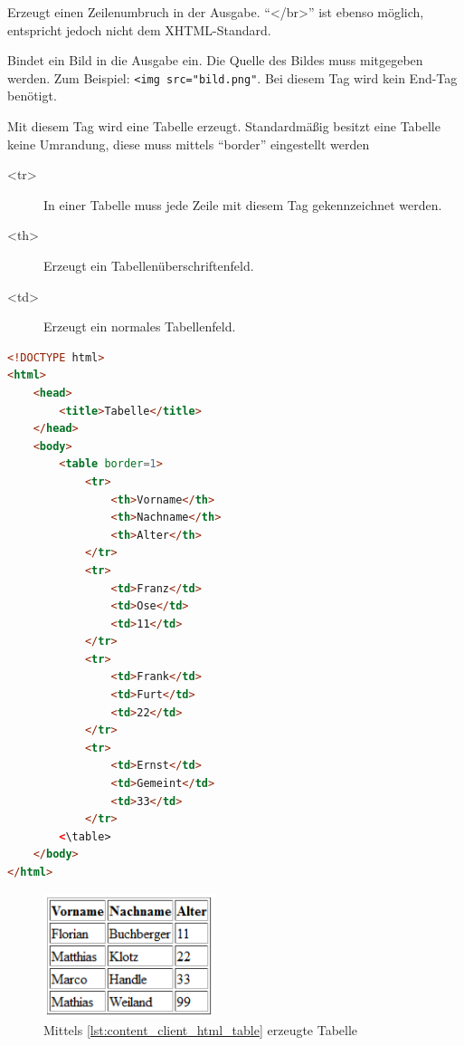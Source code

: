 \begin{description}
\begin{description} [style=nextline]
\item[<br />] Erzeugt einen Zeilenumbruch in der Ausgabe. \enquote{</br>} ist ebenso möglich, entspricht jedoch nicht dem XHTML-Standard.
\item[<img>] Bindet ein Bild in die Ausgabe ein. Die Quelle des Bildes muss mitgegeben werden. Zum Beispiel: \texttt{<img src="bild.png"}. Bei diesem Tag wird kein End-Tag benötigt.
\item[<table>] Mit diesem Tag wird eine Tabelle erzeugt. Standardmäßig besitzt eine Tabelle keine Umrandung, diese muss mittels \enquote{border} eingestellt werden
\begin{description}
\item[<tr>] In einer Tabelle muss jede Zeile mit diesem Tag gekennzeichnet werden.
\item[<th>] Erzeugt ein Tabellenüberschriftenfeld.
\item[<td>] Erzeugt ein normales Tabellenfeld.
\end{description}
\end{description}
\end{description}
\begin{lstlisting}[style=custom, language=HTML, caption={HTML-Tabelle}, label={lst:content_client_html_table}]
<!DOCTYPE html>
<html>
	<head>
		<title>Tabelle</title>
	</head>
	<body>
		<table border=1> 
			<tr>
				<th>Vorname</th>
				<th>Nachname</th>
				<th>Alter</th>
			</tr>
			<tr>
				<td>Franz</td>
				<td>Ose</td>
				<td>11</td>
			</tr>
			<tr>
				<td>Frank</td>
				<td>Furt</td>
				<td>22</td>
			</tr>
			<tr>
				<td>Ernst</td>
				<td>Gemeint</td>
				<td>33</td>
			</tr>
		<\table>
	</body>
</html>
\end{lstlisting}

\begin{figure}[H]
\centering
\includegraphics[keepaspectratio=true, width=5cm]{images/screenshots/html_table.png}
\caption{Mittels \autoref{lst:content_client_html_table} erzeugte Tabelle}
\label{fig:content_html_table}
\end{figure}

